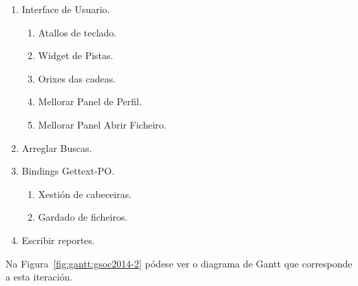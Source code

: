 \begin{enumerate}[label=\bfseries WBS 2.\arabic*]
  \item Interface de Usuario.
    \begin{enumerate}[label=\bfseries WBS 2.1.\arabic*]
      \item Atallos de teclado.
      \item Widget de Pistas.
      \item Orixes das cadeas.
      \item Mellorar Panel de Perfil.
      \item Mellorar Panel Abrir Ficheiro.
    \end{enumerate}
  \item Arreglar Buscas.
  \item Bindings Gettext-PO.
    \begin{enumerate}[label=\bfseries WBS 2.3.\arabic*]
      \item Xestión de cabeceiras.
      \item Gardado de ficheiros.
    \end{enumerate}
  \item Escribir reportes.
\end{enumerate}

Na Figura~\ref{fig:gantt:gsoc2014-2} pódese ver o diagrama de Gantt que corresponde a esta iteración.

